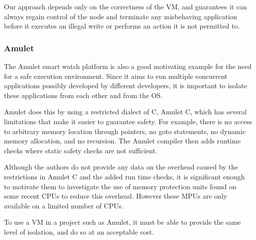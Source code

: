 Our approach depends only on the correctness of the VM, and guarantees it can always regain control of the node and terminate any misbehaving application before it executes an illegal write or performs an action it is not permitted to.

\subsubsection{Amulet}
The Amulet \cite{Hester:2016je} smart watch platform is also a good motivating example for the need for a safe execution environment. Since it aims to run multiple concurrent applications possibly developed by different developers, it is important to isolate these applications from each other and from the OS.

Amulet does this by using a restricted dialect of C, Amulet C, which has several limitations that make it easier to guarantee safety. For example, there is no access to arbitrary memory location through pointers, no goto statements, no dynamic memory allocation, and no recursion. The Amulet compiler then adds runtime checks where static safety checks are not sufficient.

Although the authors do not provide any data on the overhead caused by the restrictions in Amulet C and the added run time checks, it is significant enough to motivate them to investigate the use of memory protection units found on some recent CPUs \cite{Hardin:2017cq} to reduce this overhead. However these MPUs are only available on a limited number of CPUs.

To use a VM in a project such as Amulet, it must be able to provide the same level of isolation, and do so at an acceptable cost.


